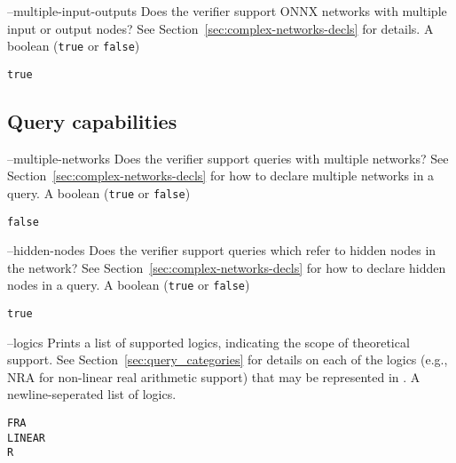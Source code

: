 \clOutputOption
{--multiple-input-outputs}
{Does the verifier support ONNX networks with multiple input or output nodes? See Section~\ref{sec:complex-networks-decls} for details.}
{A boolean (\texttt{true} or \texttt{false})}
\begin{lstlisting}[style=bash]
%*\exampleVerifier* supports --multiple-inputs-outputs
true
\end{lstlisting}

\subsection{Query capabilities}

\clOutputOption
{--multiple-networks}
{Does the verifier support queries with multiple networks? See Section~\ref{sec:complex-networks-decls} for how to declare multiple networks in a query.}
{A boolean (\texttt{true} or \texttt{false})}
\begin{lstlisting}[style=bash]
%*\exampleVerifier* supports --multiple-networks
false
\end{lstlisting}

\clOutputOption
{--hidden-nodes}
{Does the verifier support queries which refer to hidden nodes in the network? See Section~\ref{sec:complex-networks-decls} for how to declare hidden nodes in a query.}
{A boolean (\texttt{true} or \texttt{false})}
\begin{lstlisting}[style=bash]
%*\exampleVerifier* supports --hidden-nodes
true
\end{lstlisting}

\clOutputOption
{--logics}
{Prints a list of supported \vnnlib{} logics, indicating the scope of theoretical support. See Section~\ref{sec:query_categories} for 
    details on each of the logics (e.g., NRA for non-linear real arithmetic support) that may be represented in \vnnlib{}.
}
{A newline-seperated list of logics.}
\begin{lstlisting}[style=bash]
%*\exampleVerifier* supports --logics
FRA
LINEAR
R
\end{lstlisting}



